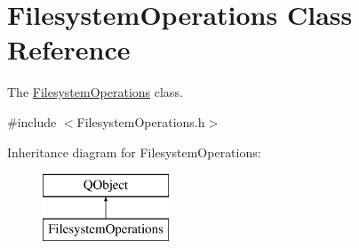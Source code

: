 \hypertarget{class_filesystem_operations}{}\section{Filesystem\+Operations Class Reference}
\label{class_filesystem_operations}


The \mbox{\hyperlink{class_filesystem_operations}{Filesystem\+Operations}} class.  




{\ttfamily \#include $<$Filesystem\+Operations.\+h$>$}

Inheritance diagram for Filesystem\+Operations\+:\begin{figure}[H]
\begin{center}
\leavevmode
\includegraphics[height=2.000000cm]{class_filesystem_operations}
\end{center}
\end{figure}

